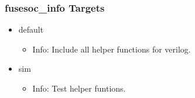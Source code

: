 \subsubsection{fusesoc\_info Targets}
\begin{itemize}
\item default
	\begin{itemize}
	\item[$\space$] Info: Include all helper functions for verilog.
	\end{itemize}
\item sim
	\begin{itemize}
	\item[$\space$] Info: Test helper funtions.
	\end{itemize}
\end{itemize}
